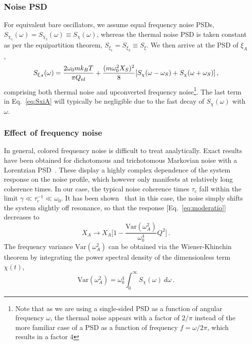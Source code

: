 \subsubsection{Noise PSD} For equivalent bare oscillators, we assume equal frequency noise PSDs, $S_{\chi_1}(\omega) = S_{\chi_2}(\omega) \equiv S_\chi(\omega)$, whereas the thermal noise PSD is taken constant as per the equipartition theorem, $S_{\xi_1} = S_{\xi_2} \equiv S_\xi$. We then arrive at the PSD of $\xi_A$,
\begin{equation} \label{eq:SxiA}
S_{\xi_A}(\omega) = \frac{2\omega_0 m k_B T}{\pi Q_{\rm nl}} + \frac{(m \omega_0^2 X_S)^2}{8} [S_{\chi}(\omega - \omega_S) + S_\chi(\omega + \omega_S)] \,,
\end{equation}
comprising both thermal noise and upconverted frequency noise\footnote{Note that as we are using a single-sided PSD as a function of angular frequency $\omega$, the thermal noise appears with a factor of $2/\pi$ instead of the more familiar case of a PSD as a function of frequency $f = \omega/2\pi$, which results in a factor $4$}. The last term in Eq.~\eqref{eq:SxiA} will typically be negligible due to the fast decay of $S_\chi(\omega)$ with $\omega$.

\subsubsection{Effect of frequency noise} In general, colored frequency noise is difficult to treat analytically. Exact results have been obtained for dichotomous and trichotomous Markovian noise with a Lorentzian PSD~\cite{Bourret_1973, Gitterman_2003, Mankin_2008}. These display a highly complex dependence of the system response on the noise profile, which however only manifests at relatively long coherence times. In our case, the typical noise coherence times $\tau_c$ fall within the limit $\gamma \ll \tau_c^{-1} \ll \omega_0$. It has been shown~\cite{Gitterman_2003} that in this case, the noise simply shifts the system slightly off resonance, so that the response [Eq.~\eqref{eq:moderatio}] decreases to
\begin{equation} \label{eq:varomega}
X_A \rightarrow X_A \bigg[1 - \frac{\text{Var}(\omega_A^2)}{\omega_0^4}Q^2\bigg] \,.
\end{equation}
The frequency variance $\text{Var}(\omega_A^2)$ can be obtained via the Wiener-Khinchin theorem by integrating the power spectral density of the dimensionless term $\chi(t)$,
\begin{equation} 
\text{Var}(\omega_A^2) = \omega_0^4 \int_0^\infty S_\chi(\omega) \:d\omega \,.
\end{equation}

